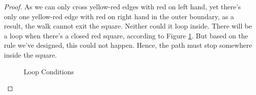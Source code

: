 \documentclass[oneside,solution]{seu-ml-assign}
\begin{document}
\begin{proof}
As we can only cross yellow-red edges with red on left hand, yet there's
only one yellow-red edge with red on right hand in the outer boundary,
as a result, the walk cannot exit the square. Neither could it loop
inside. There will be a loop when there's a closed red square, according
to Figure \ref{fig:4}. But based on the rule we've designed, this could not
happen. Hence, the path must stop somewhere inside the square.
\begin{figure}[H]
  \centering
  \hspace{0.5in} %
  \caption{Loop Conditions}
  \label{fig:4} 
\end{figure}


\end{proof}
\end{document}
